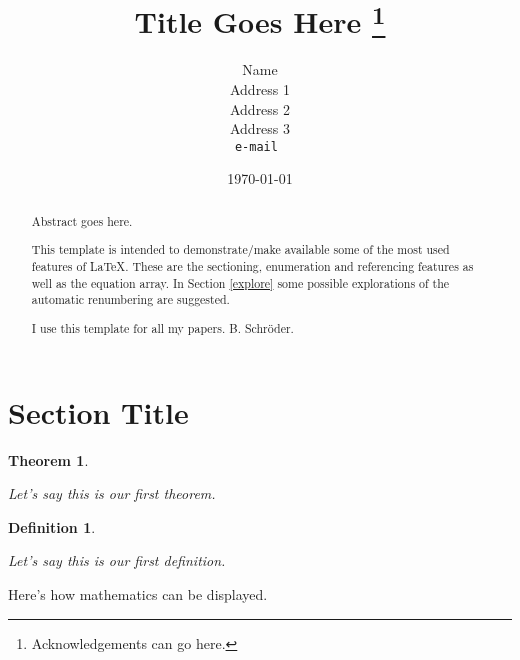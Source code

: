 \documentclass[12pt]{article}
\newtheorem{define}[guess]{Definition}
\newtheorem{theorem}[guess]{Theorem}
\begin{document}
\title{
Title Goes Here
\thanks{Acknowledgements can go here.} }



\author{
\small Name\\
\small Address 1\\
\small Address 2\\
\small Address 3\\
\small {\tt e-mail }
}


\date{\small \today}

\maketitle


\begin{abstract}

Abstract goes here.

This template is intended to demonstrate/make available some of the most used
features of \LaTeX. These are the sectioning, enumeration and referencing features as
well as the equation array. In Section \ref{explore} some possible explorations of
the automatic renumbering are suggested.

I use this template for all my papers. B. Schr\"oder.

\end{abstract}


\section{Section Title}

\begin{theorem}
\label{th1}

Let's say this is our first theorem.

\end{theorem}



\begin{define}
\label{def1}

Let's say this is our first definition.

\end{define}


Here's how mathematics can be displayed.
\end{document}
